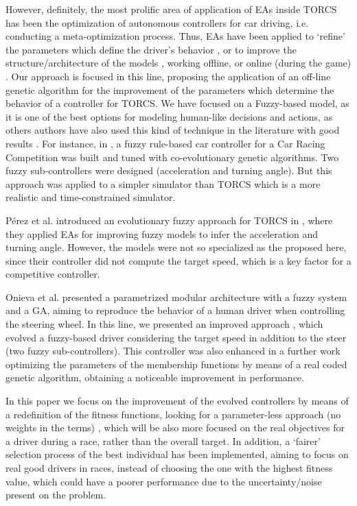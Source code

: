 \documentclass[conference]{IEEEtran}
\begin{document}
However, definitely, the most prolific area of application of EAs
inside TORCS has been the optimization of autonomous controllers for
car driving, i.e. conducting a meta-optimization process. 
Thus, EAs have been applied to `refine' the parameters which define
the driver's behavior \cite{ButzCMAES09,SAES2012}, or to improve the
structure/architecture of the models \cite{SAES2012,neurone}, working
offline, or online (during the game)
\cite{TanOnline08,Cardamone_Online_NN}.
Our approach is focused in this line, proposing the application of an off-line genetic algorithm for the improvement of the parameters which determine the behavior of a controller for TORCS. We have focused on a Fuzzy-based model, as it is one of the best options for modeling human-like decisions and actions, as others authors have also used this kind of technique in the literature with good results \cite{torcs2012}. 
For instance, in \cite{Guadarrama2008}, a fuzzy rule-based car controller for a Car Racing Competition was built and tuned with co-evolutionary genetic algorithms. Two fuzzy sub-controllers were designed (acceleration and turning angle). But this approach was applied to a simpler simulator than TORCS which is a more realistic and time-constrained simulator. 

P{\'e}rez et al. introduced an evolutionary fuzzy approach for TORCS in \cite{PerezEvolvingFuzzy09}, where they applied EAs for improving fuzzy models to infer the acceleration and turning angle. However, the models were not so specialized as the proposed here, since their controller did not compute the target speed, which is a key factor for a competitive controller. 

Onieva et al. \cite{LFAG} presented a parametrized modular architecture with a fuzzy system and a GA, aiming to reproduce the behavior of a human driver when controlling the steering wheel. In this line, we presented an improved approach \cite{evo17}, which evolved a fuzzy-based driver considering the target speed in addition to the steer (two fuzzy sub-controllers).
This controller was also enhanced in a further work \cite{evo18} optimizing the parameters of the membership functions by means of a real coded genetic algorithm, obtaining a noticeable improvement in performance.

In this paper we focus on the improvement of the evolved controllers by means of a redefinition of the fitness functions, looking for a parameter-less approach (no weights in the terms) \cite{Harik-ParameterLess99}, which will be also more focused on the real objectives for a driver during a race, rather than the overall target. In addition, a `fairer' selection process of the best individual has been implemented, aiming to focus on real good drivers in races, instead of choosing the one with the highest fitness value, which could have a poorer performance due to the uncertainty/noise present on the problem.
\end{document}
